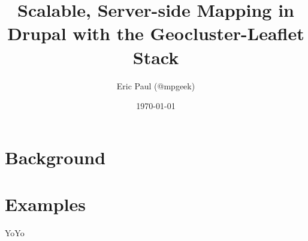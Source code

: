 \documentclass{beamer}
\begin{document}
\title[Large-Scale Mapping in Drupal with Geocluster \& Leaflet]{Scalable, Server-side Mapping in Drupal with the Geocluster-Leaflet Stack}  
\author{Eric Paul (@mpgeek)}

\date{\today} 

\frame{\titlepage} 


\section{Background} 


\section{Examples}
 {
 YoYo
}

\end{document}
